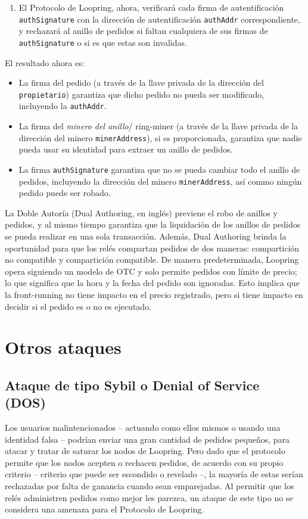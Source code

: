 \documentclass[UTF8,nofonts]{article}
\begin{document}
\begin{multicols}{2}
\begin{enumerate}
	\item El Protocolo de Loopring, ahora, verificar\'a cada firma de autentificaci\'on \verb|authSignature| con la direcci\'on de autentificaci\'on \verb|authAddr| correspondiente, y rechazar\'a al anillo de pedidos si faltan cualquiera de sus firmas de \verb|authSignature| o si es que estas son invalidas.

\end{enumerate}
El resultado ahora es:
\begin{itemize}
    \item La firma del pedido (a trav\'es de la llave privada de la direcci\'on del \verb|propietario|) garantiza que dicho pedido no pueda ser modificado, incluyendo la \verb|authAddr|.
    \item La firma del \textit{minero del anillo}/ ring-miner (a trav\'es de la llave privada de la direcci\'on del minero \verb|minerAddress|), si es proporcionada, garantiza que nadie pueda usar su identidad para extraer un anillo de pedidos.
    \item  La firma \verb|authSignature| garantiza que no se pueda cambiar todo el anillo de pedidos, incluyendo la direcci\'on del minero \verb|minerAddress|, as\'i commo ning\'un pedido puede ser robado.
\end{itemize}


La Doble Autor\'ia (Dual Authoring, en ingl\'es) previene el robo de anillos y pedidos, y al mismo tiempo garantiza que la liquidaci\'on de los anillos de pedidos se pueda realizar en una sola transacci\'on. Adem\'as, Dual Authoring brinda la oportunidad para que los rel\'es compartan pedidos de dos maneras: compartici\'on no compatible y compartici\'on compatible. De manera predeterminada, Loopring opera siguiendo un modelo de OTC y solo permite pedidos con l\'imite de precio; lo que significa que la hora y la fecha del pedido son ignoradas. Esto implica que la front-running no tiene impacto en el precio registrado, pero si tiene impacto en decidir si el pedido es o no es ejecutado.


\section{Otros ataques}
\subsection{Ataque de tipo Sybil o Denial of Service (DOS)}
Los usuarios malintencionados -- actuando como ellos mismos o usando una identidad falsa -- podr\'ian enviar una gran cantidad de pedidos peque\~nos, para atacar y tratar de saturar los nodos de Loopring. Pero dado que el protocolo permite que los nodos acepten o rechacen pedidos, de acuerdo con su propio criterio -- criterio que puede ser escondido o revelado --, la mayor\'ia de estas ser\'ian rechazadas por falta de ganancia cuando sean emparejadas. Al permitir que los rel\'es administren pedidos como mejor les parezca, un ataque de este tipo no se considera una amenaza para el Protocolo de Loopring.


\end{multicols}
\end{document}
